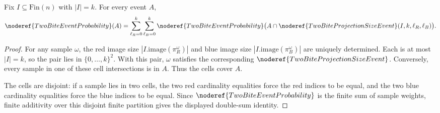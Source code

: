 \begin{helper}
Fix \(I\subseteq\mathrm{Fin}(n)\) with \(|I|=k\).  For every event \(A\),
\[
\noderef{TwoBiteEventProbability}(A)
=\sum_{\ell_R=0}^k\sum_{\ell_B=0}^k
\noderef{TwoBiteEventProbability}\bigl(A\cap
\noderef{TwoBiteProjectionSizeEvent}(I,k,\ell_R,\ell_B)\bigr).
\]
\end{helper}
\begin{proof}
For any sample \(\omega\), the red image size
\(|I.\mathrm{image}(\pi_R^\omega)|\) and blue image size
\(|I.\mathrm{image}(\pi_B^\omega)|\) are uniquely determined.  Each is at
most \(|I|=k\), so the pair lies in \(\{0,\ldots,k\}^2\).  With this pair,
\(\omega\) satisfies the corresponding
\(\noderef{TwoBiteProjectionSizeEvent}\).  Conversely, every sample in one of
these cell intersections is in \(A\).  Thus the cells cover \(A\).

The cells are disjoint: if a sample lies in two cells, the two red cardinality
equalities force the red indices to be equal, and the two blue cardinality
equalities force the blue indices to be equal.  Since
\(\noderef{TwoBiteEventProbability}\) is the finite sum of sample weights,
finite additivity over this disjoint finite partition gives the displayed
double-sum identity.
\end{proof}
